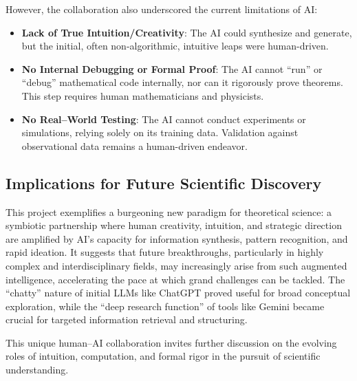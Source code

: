 \documentclass[11pt,a4paper]{article} %
\begin{document}
However, the collaboration also underscored the current limitations of AI:

\begin{itemize}
  \item \textbf{Lack of True Intuition/Creativity}: The AI could synthesize and generate, but the initial, often non-algorithmic, intuitive leaps were human-driven.
  \item \textbf{No Internal Debugging or Formal Proof}: The AI cannot “run” or “debug” mathematical code internally, nor can it rigorously prove theorems. This step requires human mathematicians and physicists.
  \item \textbf{No Real–World Testing}: The AI cannot conduct experiments or simulations, relying solely on its training data. Validation against observational data remains a human-driven endeavor.
\end{itemize}

\subsection{Implications for Future Scientific Discovery}

This project exemplifies a burgeoning new paradigm for theoretical science: a symbiotic partnership where human creativity, intuition, and strategic direction are amplified by AI’s capacity for information synthesis, pattern recognition, and rapid ideation. It suggests that future breakthroughs, particularly in highly complex and interdisciplinary fields, may increasingly arise from such augmented intelligence, accelerating the pace at which grand challenges can be tackled. The “chatty” nature of initial LLMs like ChatGPT proved useful for broad conceptual exploration, while the “deep research function” of tools like Gemini became crucial for targeted information retrieval and structuring.

This unique human–AI collaboration invites further discussion on the evolving roles of intuition, computation, and formal rigor in the pursuit of scientific understanding.




\end{document}

